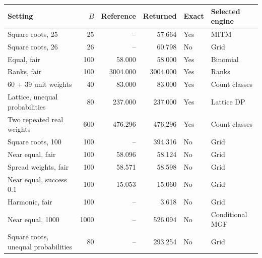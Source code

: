 \begin{tabular}{lrrrll}
\toprule
Setting & $B$ & Reference & Returned & Exact & Selected engine \\
\midrule
Square roots, 25 & 25 & -- & 57.664 & Yes & MITM \\
Square roots, 26 & 26 & -- & 60.798 & No & Grid \\
Equal, fair & 100 & 58.000 & 58.000 & Yes & Binomial \\
Ranks, fair & 100 & 3004.000 & 3004.000 & Yes & Ranks \\
60 + 39 unit weights & 40 & 83.000 & 83.000 & Yes & Count classes \\
Lattice, unequal probabilities & 80 & 237.000 & 237.000 & Yes & Lattice DP \\
Two repeated real weights & 600 & 476.296 & 476.296 & Yes & Count classes \\
Square roots, 100 & 100 & -- & 394.316 & No & Grid \\
Near equal, fair & 100 & 58.096 & 58.124 & No & Grid \\
Spread weights, fair & 100 & 58.571 & 58.598 & No & Grid \\
Near equal, success 0.1 & 100 & 15.053 & 15.060 & No & Grid \\
Harmonic, fair & 100 & -- & 3.618 & No & Grid \\
Near equal, 1000 & 1000 & -- & 526.094 & No & Conditional MGF \\
Square roots, unequal probabilities & 80 & -- & 293.254 & No & Grid \\
\bottomrule
\end{tabular}
